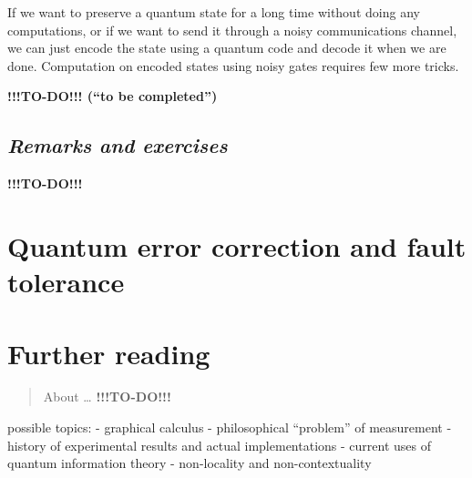 \documentclass[fleqn]{article}
\let\oldsection\section
\renewcommand\section{\clearpage\oldsection}
\begin{document}
If we want to preserve a quantum state for a long time without doing any computations, or if we want to send it through a noisy communications channel, we can just encode the state using a quantum code and decode it when we are done.
Computation on encoded states using noisy gates requires few more tricks.

\textbf{!!!TO-DO!!! (``to be completed'')}

\hypertarget{remarks-and-exercises-11}{%
\subsection{\texorpdfstring{\emph{Remarks and exercises}}{Remarks and exercises}}\label{remarks-and-exercises-11}}

\textbf{!!!TO-DO!!!}

\hypertarget{quantum-error-correction-and-fault-tolerance}{%
\section{Quantum error correction and fault tolerance}\label{quantum-error-correction-and-fault-tolerance}}

\hypertarget{further-reading}{%
\section{Further reading}\label{further-reading}}

\begin{quote}
About \ldots{} \textbf{!!!TO-DO!!!}
\end{quote}

possible topics:
- graphical calculus
- philosophical ``problem'' of measurement
- history of experimental results and actual implementations
- current uses of quantum information theory
- non-locality and non-contextuality
\end{document}
